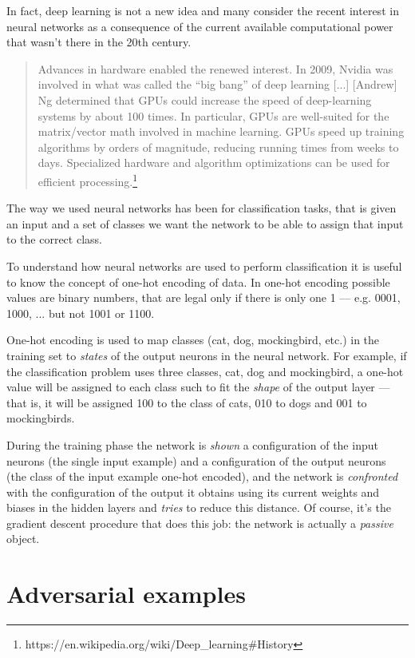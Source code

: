 In fact, deep learning is not a new idea and many consider the recent
interest in neural networks as a consequence of the current available
computational power that wasn't there in the 20th century.

\begin{quote}
  Advances in hardware enabled the renewed interest. In 2009, Nvidia
  was involved in what was called the ``big bang'' of deep learning
  [...] [Andrew] Ng determined that GPUs could increase the speed of
  deep-learning systems by about 100 times. In particular, GPUs are
  well-suited for the matrix/vector math involved in machine learning.
  GPUs speed up training algorithms by orders of magnitude, reducing
  running times from weeks to days. Specialized hardware and algorithm
  optimizations can be used for efficient
  processing.\footnote{https://en.wikipedia.org/wiki/Deep\_learning\#History}
\end{quote}

The way we used neural networks has been for classification tasks, that
is given an input and a set of classes we want the network to be able
to assign that input to the correct class.

To understand how neural networks are used to perform classification it
is useful to know the concept of one-hot encoding of data. In one-hot
encoding possible values are binary numbers, that are legal only if
there is only one 1 --- e.g. 0001, 1000, ... but not 1001 or 1100.

One-hot encoding is used to map classes (cat, dog, mockingbird, etc.)
in the training set to \emph{states} of the output neurons in the
neural network. For example, if the classification problem uses three
classes, cat, dog and mockingbird, a one-hot value will be assigned to
each class such to fit the \emph{shape} of the output layer --- that
is, it will be assigned 100 to the class of cats, 010 to dogs and 001
to mockingbirds.

During the training phase the network is \emph{shown} a
configuration of the input neurons (the single input example) and a
configuration of the output neurons (the class of the input example
one-hot encoded), and the network is \emph{confronted} with the
configuration of the output it obtains using its current weights and biases
in the hidden layers and \emph{tries} to reduce this distance. Of
course, it's the gradient descent procedure that does this job: the
network is actually a \emph{passive} object.

\section{Adversarial examples}
\label{sec:adversarial-examples}


